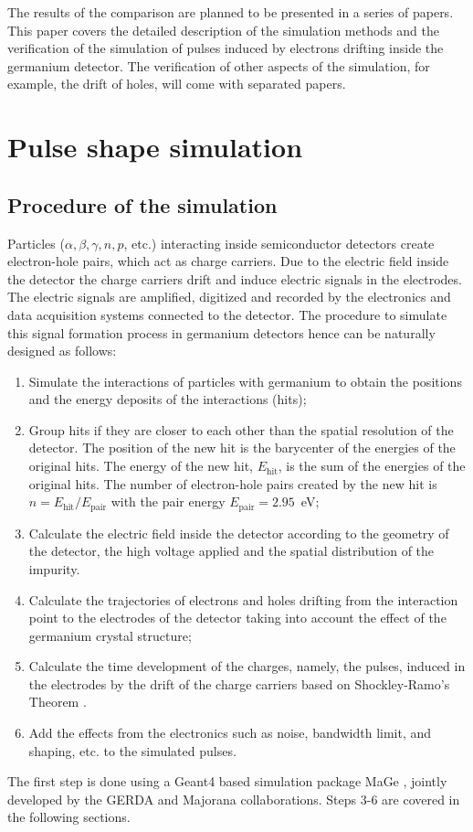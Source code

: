 \documentclass[epj,referee]{svjour}
\begin{document}
The results of the comparison are planned to be presented in a series
of papers. This paper covers the detailed description of the
simulation methods and the verification of the simulation of pulses
induced by electrons drifting inside the germanium detector. The
verification of other aspects of the simulation, for example, the
drift of holes, will come with separated papers.

\section{Pulse shape simulation}
\label{s:pss}
\subsection{Procedure of the simulation}
\label{s:proc}
Particles ($\alpha, \beta, \gamma, n, p$, etc.) interacting inside
semiconductor detectors create electron-hole pairs, which act as
charge carriers. Due to the electric field inside the detector the
charge carriers drift and induce electric signals in the
electrodes. The electric signals are amplified, digitized and recorded
by the electronics and data acquisition systems connected to the
detector. The procedure to simulate this signal formation process in
germanium detectors hence can be naturally designed as follows:
\begin{enumerate} 
\item Simulate the interactions of particles with germanium to obtain
the positions and the energy deposits of the interactions (hits);
\item Group hits if they are closer to each other than the spatial
resolution of the detector. The position of the new hit is the
barycenter of the energies of the original hits. The energy of the new
hit, $E_{\mbox{hit}}$, is the sum of the energies of the original
hits. The number of electron-hole pairs created by the new hit is $n =
E_{\mbox{hit}} / E_{\mbox{pair}}$ with the pair energy
$E_{\mbox{pair}} = 2.95$~eV;
\item Calculate the electric field inside the detector according to
the geometry of the detector, the high voltage applied and the spatial
distribution of the impurity.
\item Calculate the trajectories of electrons and holes drifting from
the interaction point to the electrodes of the detector taking into
account the effect of the germanium crystal structure;
\item Calculate the time development of the charges, namely, the
pulses, induced in the electrodes by the drift of the charge carriers
based on Shockley-Ramo's Theorem \cite{Gat82,Rad88,He00}.
\item Add the effects from the electronics such as noise, bandwidth
limit, and shaping, etc. to the simulated pulses.
\end{enumerate} 
The first step is done using a Geant4 \cite{G403,G406} based
simulation package MaGe \cite{MaGe}, jointly developed by the GERDA
and Majorana collaborations. Steps 3-6 are covered in the following
sections.
\end{document}

